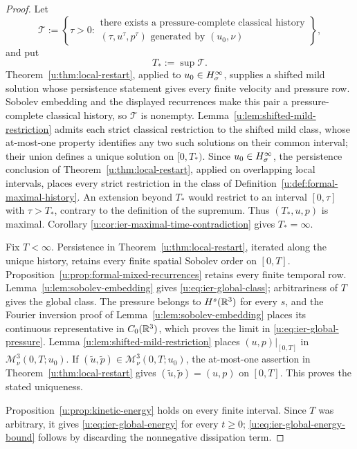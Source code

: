 \begin{proof}
 Let
 \[
  \mathscr T:=\left\{\tau>0:
  \begin{array}{c}
  \text{there exists a pressure-complete classical history}\\
  (\tau,u^\tau,p^\tau)\text{ generated by }(u_0,\nu)
  \end{array}
  \right\},
 \]
 and put
\[
 T_*:=\sup\mathscr T.
\]
 Theorem~\ref{u:thm:local-restart}, applied to \(u_0\in H^\infty_\sigma\), supplies a
 shifted mild solution whose persistence statement gives every finite
 velocity and pressure row.  Sobolev embedding and the displayed recurrences
 make this pair a pressure-complete classical history, so \(\mathscr T\) is
 nonempty.
 Lemma~\ref{u:lem:shifted-mild-restriction} admits each strict classical
restriction to the shifted mild class, whose at-most-one property identifies
any two such solutions on their common interval; their union defines a unique
 solution on \([0,T_*)\).  Since \(u_0\in H^\infty_\sigma\), the persistence conclusion
of Theorem~\ref{u:thm:local-restart}, applied on overlapping local intervals,
places every strict restriction in the class of
Definition~\ref{u:def:formal-maximal-history}.  An extension beyond \(T_*\)
would restrict to an interval \([0,\tau]\) with \(\tau>T_*\), contrary to
the definition of the supremum.  Thus \((T_*,u,p)\) is maximal.  Corollary
\ref{u:cor:ier-maximal-time-contradiction} gives \(T_*=\infty\).

Fix \(T<\infty\).  Persistence in Theorem~\ref{u:thm:local-restart}, iterated
along the unique history, retains every finite spatial Sobolev order on
\([0,T]\).  Proposition~\ref{u:prop:formal-mixed-recurrences} retains every
finite temporal row.  Lemma~\ref{u:lem:sobolev-embedding} gives
\eqref{u:eq:ier-global-class}; arbitrariness of \(T\) gives the global class.
The pressure belongs to \(H^s(\mathbb R^3)\) for every \(s\), and the Fourier
inversion proof of Lemma~\ref{u:lem:sobolev-embedding} places its continuous
representative in \(C_0(\mathbb R^3)\), which proves the limit in
\eqref{u:eq:ier-global-pressure}.  Lemma
\ref{u:lem:shifted-mild-restriction} places \((u,p)|_{[0,T]}\) in
\(\mathscr M_\nu^3(0,T;u_0)\).  If
\((\widetilde u,\widetilde p)\in\mathscr M_\nu^3(0,T;u_0)\), the at-most-one
assertion in Theorem~\ref{u:thm:local-restart} gives
\((\widetilde u,\widetilde p)=(u,p)\) on \([0,T]\).  This proves the stated
uniqueness.

Proposition~\ref{u:prop:kinetic-energy} holds on every finite interval.  Since
\(T\) was arbitrary, it gives \eqref{u:eq:ier-global-energy} for every
\(t\ge0\); \eqref{u:eq:ier-global-energy-bound} follows by discarding the
nonnegative dissipation term.
\end{proof}
